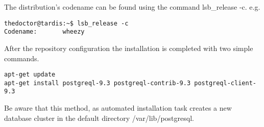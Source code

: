 The distribution's codename can be found using the command lsb\_release -c. 
e.g.
\begin{verbatim}
thedoctor@tardis:~$ lsb_release -c
Codename:       wheezy
\end{verbatim}

After the repository configuration the installation is completed with two simple commands.

\begin{verbatim}
apt-get update
apt-get install postgreql-9.3 postgreql-contrib-9.3 postgreql-client-9.3 
\end{verbatim}

Be aware that this method, as automated installation task creates a new database cluster in
the default directory /var/lib/postgresql.

